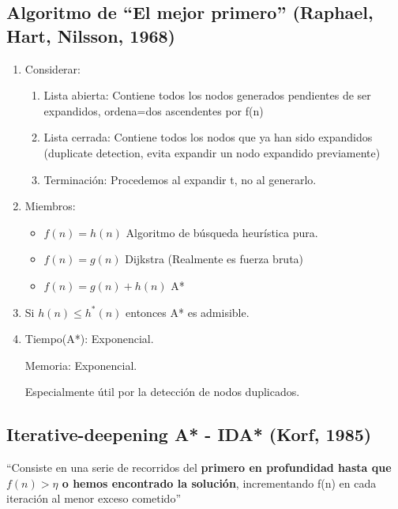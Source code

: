 \documentclass[12pt, twoside, openright]{report} %
\begin{document}
\subsection{Algoritmo de ``El mejor primero'' (Raphael, Hart, Nilsson, 1968)}


\begin{enumerate}
	\item Considerar:

	      \begin{enumerate}
		      \item Lista abierta: Contiene todos los nodos generados pendientes de
		            ser expandidos, ordena=dos ascendentes por f(n)
		      \item Lista cerrada: Contiene todos los nodos que ya han sido expandidos
		            (duplicate detection, evita expandir un nodo expandido
		            previamente)
		      \item Terminación: Procedemos al expandir t, no al generarlo.
	      \end{enumerate}
	\item Miembros:
	      \begin{itemize}
		      \item \(f(n)=h(n)\) Algoritmo de búsqueda heurística pura.
		      \item \(f(n)=g(n)\) Dijkstra (Realmente es fuerza bruta)
		      \item \(f(n) = g(n) + h(n)\) A*
	      \end{itemize}
	\item Si \(h(n) \leq h^*(n)\) entonces A* es admisible.
	\item Tiempo(A*): Exponencial.

	      Memoria: Exponencial.

	      Especialmente útil por la detección de nodos duplicados.

\end{enumerate}

\subsection{Iterative-deepening A* - IDA* (Korf, 1985)}

``Consiste en una serie de recorridos del \textbf{primero en
	profundidad hasta que \(f(n) > \eta\) o hemos encontrado la solución},
incrementando f(n) en cada iteración al menor exceso cometido''
\end{document}
